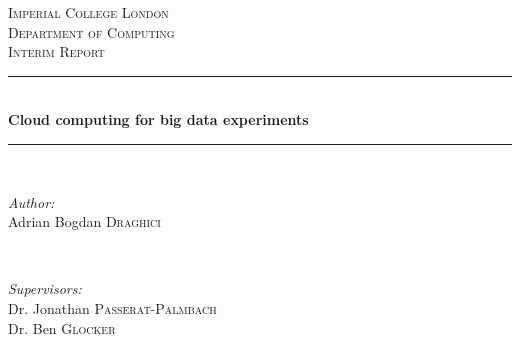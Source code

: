 \newcommand{\HRule}{\rule{\linewidth}{0.5mm}} %
\clearpage
\thispagestyle{empty}

\begin{center} %
 

\vspace{4cm}
\textsc{\LARGE Imperial College London}\\[1.5cm] %
\textsc{\Large Department of Computing}\\[0.5cm] %
\textsc{\large Interim Report}\\[0.5cm] %


\HRule \\[0.4cm]
{ \vspace{0.3cm}\huge \bfseries Cloud computing for big data experiments } \\[0.4cm] %
\HRule \\[1.5cm]
 


\begin{minipage}{0.4\textwidth}
\begin{flushleft} \large
\emph{Author:}\\
Adrian Bogdan \textsc{Draghici} \\ \vspace{0.63cm}
\end{flushleft}
\end{minipage}
~
\begin{minipage}{0.5\textwidth}
\begin{flushright} \large
\emph{Supervisors:} \\
Dr. Jonathan \textsc{Passerat-Palmbach} \\ Dr. Ben \textsc{Glocker} 
\end{flushright}


\end{minipage}
\end{center}
